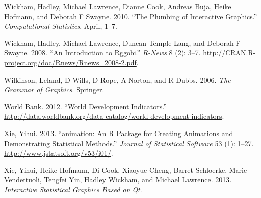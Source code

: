 \documentclass[12pt,]{article}
\theoremstyle{definition}
\theoremstyle{definition}
\theoremstyle{remark}
\begin{document}
\hypertarget{ref-plumbing}{}
Wickham, Hadley, Michael Lawrence, Dianne Cook, Andreas Buja, Heike
Hofmann, and Deborah F Swayne. 2010. ``The Plumbing of Interactive
Graphics.'' \emph{Computational Statistics}, April, 1--7.

\hypertarget{ref-rggobi}{}
Wickham, Hadley, Michael Lawrence, Duncan Temple Lang, and Deborah F
Swayne. 2008. ``An Introduction to Rggobi.'' \emph{R-News} 8 (2): 3--7.
\url{http://CRAN.R-project.org/doc/Rnews/Rnews_2008-2.pdf}.

\hypertarget{ref-wilkinson}{}
Wilkinson, Leland, D Wills, D Rope, A Norton, and R Dubbs. 2006.
\emph{The Grammar of Graphics}. Springer.

\hypertarget{ref-WorldBank}{}
World Bank. 2012. ``World Development Indicators.''
\url{http://data.worldbank.org/data-catalog/world-development-indicators}.

\hypertarget{ref-animation}{}
Xie, Yihui. 2013. ``animation: An R Package for Creating Animations and
Demonstrating Statistical Methods.'' \emph{Journal of Statistical
Software} 53 (1): 1--27. \url{http://www.jstatsoft.org/v53/i01/}.

\hypertarget{ref-cranvas}{}
Xie, Yihui, Heike Hofmann, Di Cook, Xiaoyue Cheng, Barret Schloerke,
Marie Vendettuoli, Tengfei Yin, Hadley Wickham, and Michael Lawrence.
2013. \emph{Interactive Statistical Graphics Based on Qt}.
\end{document}
